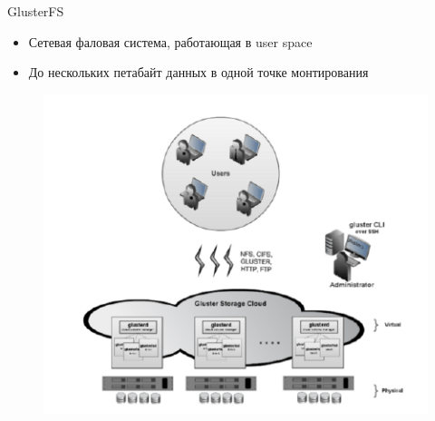 \documentclass{beamer}
\begin{document}
\begin{frame}{GlusterFS}
	\begin{itemize}
		\item Сетевая фаловая система, работающая в user space
		\item До нескольких петабайт данных в одной точке монтирования
	\end{itemize}
	\begin{figure}[h]
		\centering
		\includegraphics[width=0.7\linewidth]{scheme.png}
	\end{figure}
\end{frame}
\end{document}
